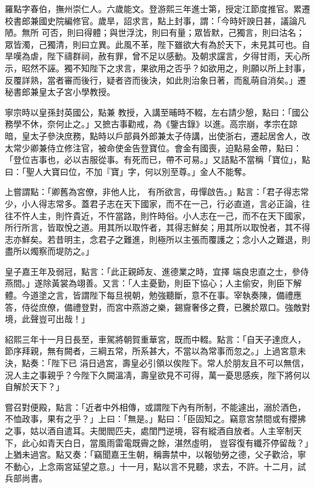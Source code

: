 \begin{pinyinscope}
 羅點字春伯，撫州崇仁人。六歲能文。登游熙三年進士第，授定江節度推官。累遷校書郎兼國史院編修官。歲旱，詔求言，點上封事，謂：「今時奸諛日甚，議論凡陋。無所
 可否，則曰得體；與世浮沈，則曰有量；眾皆默，己獨言，則曰沽名；眾皆濁，己獨清，則曰立異。此風不革，陛下雖欲大有為於天下，未見其可也。自旱嘆為虐，陛下禱群祠，赦有罪，曾不足以感動。及朝求讜言，夕得甘雨，天心所示，昭然不誣。獨不知陛下之求言，果欲用之否乎？如欲用之，則願以所上封事，反覆詳熟，當者審而後行，疑者咨而後決，如此則治象日著，而亂萌自消矣。」遷秘書郎兼皇太子宮小學教授。



 寧宗時以皇孫封英國公，點兼
 教授，入講至晡時不輟，左右請少憩，點曰：「國公務學不休，奈何止之。」又摭古事勸戒，為《鑒古錄》以進。高宗崩，孝宗在諒暗，皇太子參決庶務，點時以戶部員外郎兼太子侍講，出使浙右，遷起居舍人，改太常少卿兼侍立修注官，被命使金告登寶位。會金有國喪，迫點易金帶，點曰：「登位吉事也，必以吉服從事。有死而已，帶不可易。」又詰點不當稱「寶位」，點曰：「聖人大寶曰位，不加『寶」字，何以別至尊。」金人不能奪。



 上嘗謂點：「卿舊為宮僚，非他人比，
 有所欲言，毋憚啟告。」點言：「君子得志常少，小人得志常多。蓋君子志在天下國家，而不在一己，行必直道，言必正論，往往不忤人主，則忤貴近，不忤當路，則忤時俗。小人志在一己，而不在天下國家，所行所言，皆取悅之道。用其所以取忤者，其得志鮮矣；用其所以取悅者，其不得志亦鮮矣。若昔明主，念君子之難進，則極所以主張而覆護之；念小人之難退，則盡所以燭察而堤防之。」



 皇子嘉王年及弱冠，點言：「此正親師友、進德業之時，宜擇
 端良忠直之士，參侍燕間。」遂除黃裳為翊善。又言：「人主憂勤，則臣下協心；人主偷安，則臣下解體。今道塗之言，皆謂陛下每旦視朝，勉強聽斷，意不在事。宰執奏陳，備禮應答，侍從庶僚，備禮登對，而宮中燕游之樂，錫齎奢侈之費，已騰於眾口。強敵對境，此聲豈可出哉！」



 紹熙三年十一月日長至，車駕將朝賀重華宮，既而中輟。點言：「自天子達庶人，節序拜親，無有闕者，三綱五常，所系甚大，不當以為常事而忽之。」上過宮意未決，點奏：「陛下已
 涓日過宮，壽皇必引領以俟陛下。常人於朋友且不可以無信，況人主之事親乎？今陛下久闕溫凊，壽皇欲見不可得，萬一憂思感疾，陛下將何以自解於天下？」



 嘗召對便殿，點言：「近者中外相傳，或謂陛下內有所制，不能遽出，溺於酒色，不恤政事，果有之乎？」上曰：「無是。」點曰：「臣固知之。竊意宮禁間或有攖拂之事，姑以酒自遣耳。夫閭閻匹夫，處閨門逆境，容有縱酒自放者。人主宰制天下，此心如青天白日，當風雨雷電既霽之餘，湛然虛明，
 豈容復有纖芥停留哉？」上猶未過宮。點又奏：「竊聞嘉王生朝，稱壽禁中，以報劬勞之德，父子歡洽，寧不動心，上念兩宮延望之意。」十一月，點以言不見聽，求去，不許。十二月，試兵部尚書。




\end{pinyinscope}
